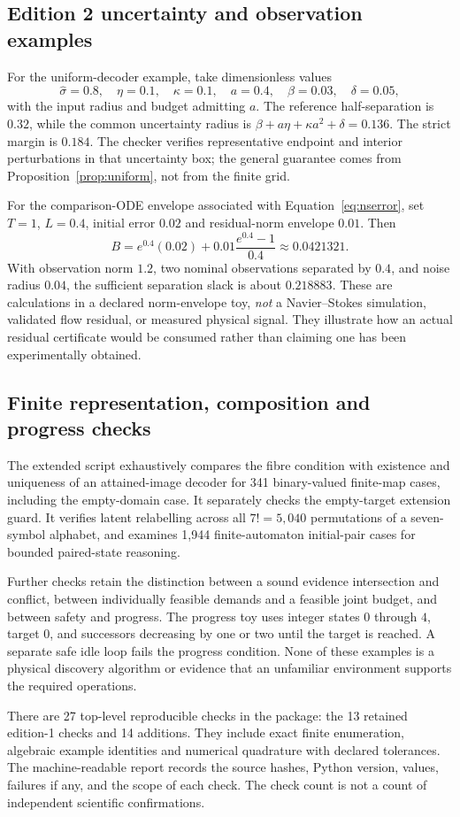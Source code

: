 \subsection{Edition 2 uncertainty and observation examples}
For the uniform-decoder example, take dimensionless values
\[
 \hat\sigma=0.8,\quad\eta=0.1,\quad\kappa=0.1,\quad
 a=0.4,\quad\beta=0.03,\quad\delta=0.05,
\]
with the input radius and budget admitting $a$. The reference half-separation is $0.32$, while the common uncertainty radius is
$\beta+a\eta+\kappa a^2+\delta=0.136$. The strict margin is $0.184$. The checker verifies representative endpoint and interior perturbations in that uncertainty box; the general guarantee comes from Proposition~\ref{prop:uniform}, not from the finite grid.

For the comparison-ODE envelope associated with Equation~\eqref{eq:nserror}, set $T=1$, $L=0.4$, initial error $0.02$ and residual-norm envelope $0.01$. Then
\[
 B=e^{0.4}(0.02)+0.01\frac{e^{0.4}-1}{0.4}\approx0.0421321.
\]
With observation norm $1.2$, two nominal observations separated by $0.4$, and noise radius $0.04$, the sufficient separation slack is about $0.218883$. These are calculations in a declared norm-envelope toy, \emph{not} a Navier--Stokes simulation, validated flow residual, or measured physical signal. They illustrate how an actual residual certificate would be consumed rather than claiming one has been experimentally obtained.

\subsection{Finite representation, composition and progress checks}
The extended script exhaustively compares the fibre condition with existence and uniqueness of an attained-image decoder for 341 binary-valued finite-map cases, including the empty-domain case. It separately checks the empty-target extension guard. It verifies latent relabelling across all $7!=5{,}040$ permutations of a seven-symbol alphabet, and examines 1,944 finite-automaton initial-pair cases for bounded paired-state reasoning.

Further checks retain the distinction between a sound evidence intersection and conflict, between individually feasible demands and a feasible joint budget, and between safety and progress. The progress toy uses integer states $0$ through $4$, target $0$, and successors decreasing by one or two until the target is reached. A separate safe idle loop fails the progress condition. None of these examples is a physical discovery algorithm or evidence that an unfamiliar environment supports the required operations.

There are 27 top-level reproducible checks in the package: the 13 retained edition-1 checks and 14 additions. They include exact finite enumeration, algebraic example identities and numerical quadrature with declared tolerances. The machine-readable report records the source hashes, Python version, values, failures if any, and the scope of each check. The check count is not a count of independent scientific confirmations.
